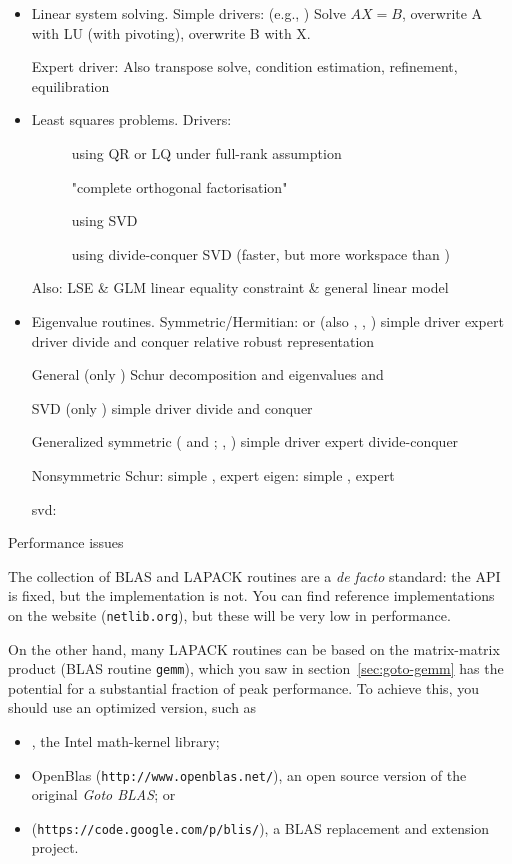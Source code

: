\begin{itemize}
\item Linear system solving.
Simple drivers:  (e.g., ) 
Solve $AX=B$, overwrite A with LU (with pivoting),
overwrite B with X.

Expert driver: 
Also transpose solve, condition estimation, refinement, equilibration
\item Least squares problems.
Drivers: 
\begin{description}
\item[] using QR or LQ under full-rank assumption
\item[] "complete orthogonal factorisation"
\item[] using SVD
\item[] using divide-conquer SVD
(faster, but more workspace than )
\end{description}

Also: LSE \& GLM linear equality constraint \& general linear model

\item Eigenvalue routines.
Symmetric/Hermitian:  or  (also , , )
simple driver 
expert driver 
divide and conquer 
relative robust representation 

General (only )
Schur decomposition  and 
eigenvalues  and 

SVD (only )
simple driver 
divide and conquer 

Generalized symmetric ( and ; , )
simple driver 
expert 
divide-conquer 

Nonsymmetric
Schur: simple , expert 
eigen: simple , expert 

svd: 

\end{itemize}

 {Performance issues}

The collection of BLAS and LAPACK routines are a \emph{de facto}
standard: the \ac{API} is fixed, but the implementation is not.
You can find reference implementations on the
 website (\texttt{netlib.org}), but
these will be very low in performance.

On the other hand, many LAPACK routines can be based on
the matrix-matrix product (BLAS routine \texttt{gemm}),
which you saw in section~\ref{sec:goto-gemm} has the potential
for a substantial fraction of peak performance. To achieve
this, you should use an optimized version, such as
\begin{itemize}
\item {}, the Intel math-kernel library;
\item OpenBlas (\texttt{http://www.openblas.net/}), an open source
  version of the original \emph{Goto BLAS}; or
\item {} (\texttt{https://code.google.com/p/blis/}), a BLAS replacement and
  extension project.
\end{itemize}


